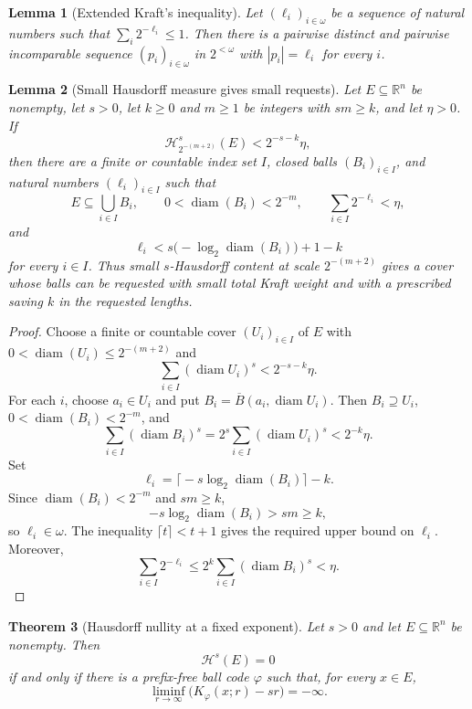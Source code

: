 \documentclass[a4paper,oneside,reqno,12pt]{amsart}
\theoremstyle{plain}
\newtheorem{theorem}{Theorem}[section]
\newtheorem{lemma}[theorem]{Lemma}
\theoremstyle{definition}
\theoremstyle{remark}
\DeclareMathOperator{\diam}{diam}
\begin{document}
\begin{lemma}[Extended Kraft's inequality]
\label{lem:kraft}
Let \((\ell_i)_{i\in\omega}\) be a sequence of natural numbers such that
\(\sum_{i}2^{-\ell_i}\le 1\).
Then there is a pairwise distinct and pairwise incomparable sequence
\((p_i)_{i\in\omega}\) in \(2^{<\omega}\) with \(|p_i|=\ell_i\) for every
\(i\).
\end{lemma}

\begin{lemma}[Small Hausdorff measure gives small requests]
\label{lem:hausdorff-requests}
Let \(E\subseteq\mathbb R^n\) be nonempty, let \(s>0\), let \(k\ge0\) and
\(m\ge1\) be integers with \(sm\ge k\), and let \(\eta>0\).  If
\[
\mathcal H^s_{2^{-(m+2)}}(E)<2^{-s-k}\eta,
\]
then there are a finite or countable index set \(I\), closed balls
\((B_i)_{i\in I}\), and natural numbers \((\ell_i)_{i\in I}\) such that
\[
E\subseteq\bigcup_{i\in I} B_i,
\qquad
0<\diam(B_i)<2^{-m},
\qquad
\sum_{i\in I}2^{-\ell_i}<\eta,
\]
and
\[
\ell_i<s\bigl(-\log_2\diam(B_i)\bigr)+1-k
\]
for every \(i\in I\).  Thus small \(s\)-Hausdorff content at scale
\(2^{-(m+2)}\) gives a cover whose balls can be requested with small total
Kraft weight and with a prescribed saving \(k\) in the requested lengths.
\end{lemma}

\begin{proof}
Choose a finite or countable cover \((U_i)_{i\in I}\) of \(E\) with
\(0<\diam(U_i)\le2^{-(m+2)}\) and
\[
\sum_{i\in I} (\diam U_i)^s<2^{-s-k}\eta.
\]
For each \(i\), choose \(a_i\in U_i\) and put
\(B_i=\overline B(a_i,\diam U_i)\).  Then \(B_i\supseteq U_i\),
\(0<\diam(B_i)<2^{-m}\), and
\[
\sum_{i\in I}(\diam B_i)^s
=2^s\sum_{i\in I}(\diam U_i)^s
<2^{-k}\eta.
\]
Set
\[
\ell_i=\bigl\lceil -s\log_2\diam(B_i)\bigr\rceil-k .
\]
Since \(\diam(B_i)<2^{-m}\) and \(sm\ge k\),
\[
-s\log_2\diam(B_i)>sm\ge k,
\]
so \(\ell_i\in\omega\).  The inequality \(\lceil t\rceil<t+1\) gives the
required upper bound on \(\ell_i\).  Moreover,
\[
\sum_{i\in I}2^{-\ell_i}
\le
2^k\sum_{i\in I}(\diam B_i)^s
<\eta.
\]
\end{proof}


\begin{theorem}[Hausdorff nullity at a fixed exponent]
\label{thm:fixed-s-hausdorff-null-code}
Let \(s>0\) and let \(E\subseteq\mathbb R^n\) be nonempty.  Then
\[
\mathcal H^s(E)=0
\]
if and only if there is a prefix-free ball code \(\varphi\) such that, for every
\(x\in E\),
\[
\liminf_{r\to\infty}\bigl(K_\varphi(x;r)-sr\bigr)=-\infty.
\]
\end{theorem}
\end{document}

